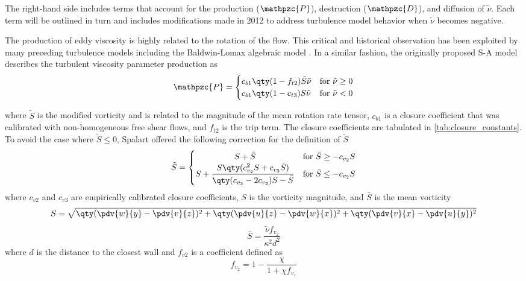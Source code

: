 The right-hand side includes terms that account for the production ($\mathpzc{P}$), destruction ($\mathpzc{D}$), and diffusion of $\tilde{\nu}$. Each term will be outlined in turn and includes modifications made in 2012 \cite{Allmaras2012} to address turbulence model behavior when $\tilde{\nu}$ becomes negative.

The production of eddy viscosity is highly related to the rotation of the flow. This critical and historical observation has been exploited by many preceding turbulence models including the Baldwin-Lomax algebraic model \cite{Baldwin1978}. In a similar fashion, the originally proposed S-A model describes the turbulent viscosity parameter production as
%
\begin{align}
\mathpzc{P} = \begin{cases}
  c_{b1}\qty(1-f_{t2})\tilde S\tilde\nu & $for $ \tilde\nu \geq 0 \\
  c_{b1}\qty(1-c_{t3})S\tilde\nu      & $for $ \tilde\nu < 0
\end{cases}
\end{align}

where $\tilde{S}$ is the modified vorticity and is related to the magnitude of the mean rotation rate tensor, $c_{b1}$ is a closure coefficient that was calibrated with non-homogeneous free shear flows, and $f_{t2}$ is the trip term. The closure coefficients are tabulated in \cref{tab:closure_constants}. To avoid the case where $\tilde{S} \leq 0$, Spalart offered the following correction for the definition of $\tilde{S}$ \cite{Spalart2000}
%
\begin{align}
\tilde{S} = \begin{cases}
	\hfil S + \bar{S} & $for $\bar{S} \geq -c_{v_2}S \\
    S + \dfrac{S\qty(c^2_{v_2}S+c_{v_3}\bar{S})}{\qty(c_{v_3}-2c_{v_2})S-\bar{S}} & $for $\bar{S} \leq -c_{v_2}S
\end{cases}
\end{align}
%
where $c_{v2}$ and $c_{v3}$ are empirically calibrated closure coefficients, $S$ is the vorticity magnitude, and $\bar{S}$ is the mean vorticity
%
$$ S = \sqrt{\qty(\pdv{w}{y}-\pdv{v}{z})^2 + \qty(\pdv{u}{z}-\pdv{w}{x})^2 + \qty(\pdv{v}{x}-\pdv{u}{y})^2} $$
%
$$ \bar{S} = \frac{\tilde{\nu}f_{v_2}}{\kappa^2d^2} $$
%
where $d$ is the distance to the closest wall and $f_{v2}$ is a coefficient defined as
%
$$ f_{v_2} = 1 - \frac{\chi}{1+\chi f_{v_1}} $$

